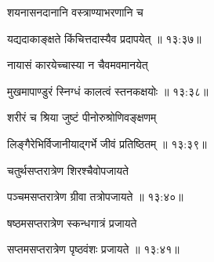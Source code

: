 {\devanagarifont शयनासनदानानि वस्त्राण्याभरणानि च \thinspace{\dandab} \dontdisplaylinenum }%


{\devanagarifont यद्यदाकाङ्क्षते किंचित्तदास्यैव प्रदापयेत् {॥ १३:३७॥} \veg\dontdisplaylinenum }%

{\devanagarifont नायासं कारयेच्चास्या न चैवमवमानयेत् \thinspace{\dandab} \dontdisplaylinenum }%


{\devanagarifont मुखमापाण्डुरं स्निग्धं कालत्वं स्तनकक्षयोः {॥ १३:३८॥} \veg\dontdisplaylinenum }%

{\devanagarifont शरीरं च श्रिया जुष्टं पीनोरुश्रोणिवङ्क्षणम् \thinspace{\dandab} \dontdisplaylinenum }%


{\devanagarifont लिङ्गैरेभिर्विजानीयाद्गर्भे जीवं प्रतिष्ठितम् {॥ १३:३९॥} \veg\dontdisplaylinenum }%

{\devanagarifont चतुर्थसप्तरात्रेण शिरश्चैवोपजायते \thinspace{\dandab} \dontdisplaylinenum }%


{\devanagarifont पञ्चमसप्तरात्रेण ग्रीवा तत्रोपजायते {॥ १३:४०॥} \veg\dontdisplaylinenum }%
 
{\devanagarifont षष्ठमसप्तरात्रेण स्कन्धगात्रं प्रजायते \thinspace{\dandab} \dontdisplaylinenum }%
 

{\devanagarifont सप्तमसप्तरात्रेण पृष्ठवंशः प्रजायते {॥ १३:४१॥} \veg\dontdisplaylinenum }%


